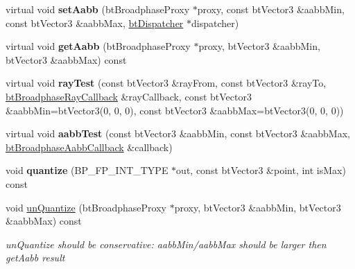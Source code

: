 \begin{DoxyCompactItemize}
\mbox{\label{classbtAxisSweep3Internal_a63cea29c28e0b3852182f4971ec3f7e5}} 
virtual void {\bfseries set\+Aabb} (bt\+Broadphase\+Proxy $\ast$proxy, const bt\+Vector3 \&aabb\+Min, const bt\+Vector3 \&aabb\+Max, \hyperlink{classbtDispatcher}{bt\+Dispatcher} $\ast$dispatcher)
\item 
\mbox{\label{classbtAxisSweep3Internal_a1f45b60f3a8cb35376ca06e727902ff0}} 
virtual void {\bfseries get\+Aabb} (bt\+Broadphase\+Proxy $\ast$proxy, bt\+Vector3 \&aabb\+Min, bt\+Vector3 \&aabb\+Max) const
\item 
\mbox{\label{classbtAxisSweep3Internal_ac26477769762c0969dff980385c50070}} 
virtual void {\bfseries ray\+Test} (const bt\+Vector3 \&ray\+From, const bt\+Vector3 \&ray\+To, \hyperlink{structbtBroadphaseRayCallback}{bt\+Broadphase\+Ray\+Callback} \&ray\+Callback, const bt\+Vector3 \&aabb\+Min=bt\+Vector3(0, 0, 0), const bt\+Vector3 \&aabb\+Max=bt\+Vector3(0, 0, 0))
\item 
\mbox{\label{classbtAxisSweep3Internal_a49fb65a9b4fa5e7b3e2fb941e59ca21d}} 
virtual void {\bfseries aabb\+Test} (const bt\+Vector3 \&aabb\+Min, const bt\+Vector3 \&aabb\+Max, \hyperlink{structbtBroadphaseAabbCallback}{bt\+Broadphase\+Aabb\+Callback} \&callback)
\item 
\mbox{\label{classbtAxisSweep3Internal_a852908ebce2e0b632f18cae17860fc47}} 
void {\bfseries quantize} (B\+P\+\_\+\+F\+P\+\_\+\+I\+N\+T\+\_\+\+T\+Y\+PE $\ast$out, const bt\+Vector3 \&point, int is\+Max) const
\item 
\mbox{\label{classbtAxisSweep3Internal_a33d53264ea5d7f695e97200ca752fbe5}} 
void \hyperlink{classbtAxisSweep3Internal_a33d53264ea5d7f695e97200ca752fbe5}{un\+Quantize} (bt\+Broadphase\+Proxy $\ast$proxy, bt\+Vector3 \&aabb\+Min, bt\+Vector3 \&aabb\+Max) const
\begin{DoxyCompactList}\small\item\em un\+Quantize should be conservative\+: aabb\+Min/aabb\+Max should be larger then \textquotesingle{}get\+Aabb\textquotesingle{} result \end{DoxyCompactList}\item 

\end{DoxyCompactItemize}
